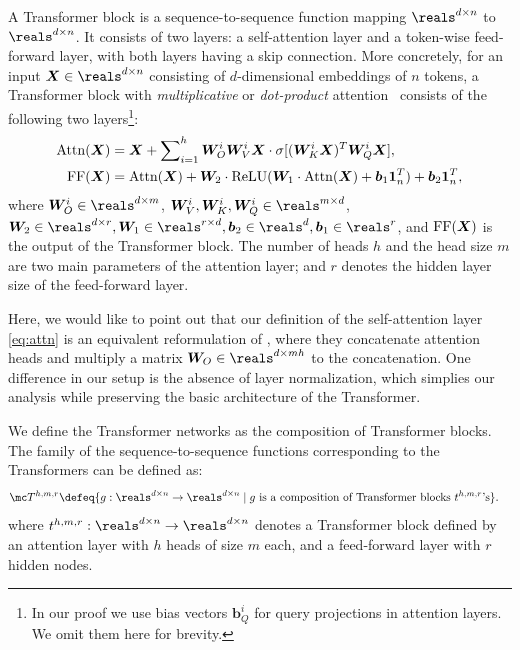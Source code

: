 \documentclass{article} %
\def\vone{{\bm{1}}}
\def\vb{{\bm{b}}}
\def\mW{{\bm{W}}}
\def\mX{{\bm{X}}}
\newcommand{\sfmx}{\sigma}
\newcommand{\relu}{{\rm ReLU}}
\newcommand{\attn}{{\rm Attn}}
\newcommand{\ff}{{\rm FF}}
\begin{document}
A Transformer block is a sequence-to-sequence function mapping $\reals^{d \times n}$ to $\reals^{d \times n}$. It consists of two layers: a self-attention layer and a token-wise feed-forward layer, with both layers having a skip connection. More concretely, for an input $\mX \in \reals^{d \times n}$ consisting of $d$-dimensional embeddings of $n$ tokens, a Transformer block with {\em multiplicative} or {\em dot-product} attention~\citep{luong2015multiplicativ} consists of the following two layers\footnote{In our proof we use bias vectors $\vb_Q^i$ for query projections in attention layers. We omit them here for brevity.}:
\begin{align}
    \label{eq:attn}
    \attn(\mX) &= \mX + \sum\nolimits_{i=1}^h \mW_O^i \mW_V^i \mX \cdot \sfmx [(\mW_K^i \mX)^T \mW_Q^i \mX],\\
    \label{eq:ff}
    \ff(\mX) &= \attn(\mX) + \mW_2 \cdot \relu (\mW_1 \cdot \attn(\mX) + \vb_1 \vone_n^T) + \vb_2 \vone_n^T,
\end{align}
where $\mW_O^i \in \reals^{d \times m}$, $\mW_V^i, \mW_K^i, \mW_Q^i \in \reals^{m \times d}$, $\mW_2 \in \reals^{d \times r}, \mW_1 \in \reals^{r \times d}, \vb_2 \in \reals^{d}, \vb_1 \in \reals^{r}$, and $\ff(\mX)$ is the output of the Transformer block. The number of heads $h$ and the head size $m$ are two main parameters of the attention layer; and $r$ denotes the hidden layer size of the feed-forward layer.

Here, we would like to point out that our definition of the self-attention layer \eqref{eq:attn} is an equivalent reformulation of \citep{vaswani2017attention}, where they concatenate attention heads and multiply a matrix $\mW_O \in \reals^{d \times mh}$ to the concatenation.
One difference in our setup is the absence of layer normalization, which simplies our analysis while preserving the basic architecture of the Transformer.


We define the Transformer networks as the composition of Transformer blocks. The family of the sequence-to-sequence functions corresponding to the Transformers can be defined as:
\begin{align*}
    \mc T^{h,m,r} 
    &\defeq 
    \{ g: \reals^{d \times n} \to \reals^{d \times n} \mid 
    \text{$g$ is a composition of Transformer blocks $t^{h,m,r}$'s} \}.
\end{align*}
where $t^{h,m,r}:\reals^{d \times n} \to \reals^{d \times n}$ denotes a Transformer block defined by an attention layer with $h$ heads of size $m$ each, and a feed-forward layer with $r$ hidden nodes. 
\end{document}
